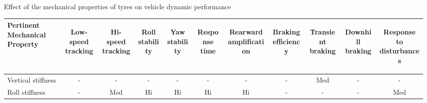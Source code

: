 \begin{table}[H]
\begin{threeparttable}
		\caption{Effect of the mechanical properties of tyres on vehicle dynamic performance \cite{Fancher1986}}
		\label{table:effect-of-the-mechanical-properties-of-tyres-on-vehicle-dynamic-performance}

	\end{threeparttable}
\end{table}

\begin{table}[H]
	\centering\footnotesize
	\begin{threeparttable}
	
        \begin{tabulary}{\textwidth}{lcccccccccc}
            \toprule
            \textbf{Pertinent Mechanical Property} & \begin{sideways}\textbf{Low-speed tracking}\end{sideways} & \begin{sideways}\textbf{Hi-speed tracking}\end{sideways} & \begin{sideways}\textbf{Roll stability}\end{sideways} & \begin{sideways}\textbf{Yaw stability}\end{sideways} & \begin{sideways}\textbf{Response time}\end{sideways} & \begin{sideways}\textbf{Rearward amplification}\end{sideways} & \begin{sideways}\textbf{Braking efficiency}\end{sideways} & \begin{sideways}\textbf{Transient braking}\end{sideways} & \begin{sideways}\textbf{Downhill braking}\end{sideways} & \begin{sideways}\textbf{Response to disturbances}\end{sideways} \\\midrule
            Vertical stiffness & -     & -     & -     & -     & -     & -     & -     & Med   & -     & - \\
            Roll stiffness & -     & Med   & Hi    & Hi    & Hi    & Hi    & -     & -     & -     & Med \\

\end{tabulary}
\end{threeparttable}
\end{table}
